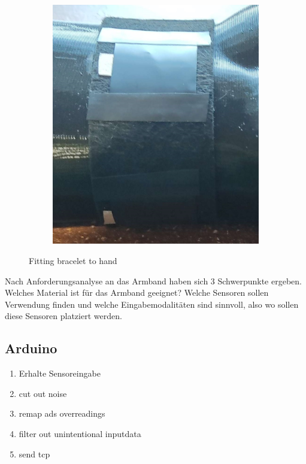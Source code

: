 \documentclass[12pt, a4paper]{article}
\begin{document}
\begin{figure}[h]
\begin{subfigure}[c]{0.33\textwidth}
		\includegraphics[scale=.037]{assets/crop_sensor_fitting.jpg}
		\label{fig:Initial_drawing}
	\end{subfigure}
	\caption{Fitting bracelet to hand}
\end{figure}






Nach Anforderungsanalyse an das Armband haben sich 3 Schwerpunkte ergeben. Welches Material ist für das Armband geeignet? Welche Sensoren sollen Verwendung finden und welche Eingabemodalitäten sind sinnvoll, also wo sollen diese Sensoren platziert werden.


\subsection{Arduino}


\begin{enumerate}
	\item{Erhalte Sensoreingabe}	
	\item{cut out noise}
	\item{remap ads overreadings}
	\item{filter out unintentional inputdata}
	\item{send tcp}
\end{enumerate}
\end{document}

